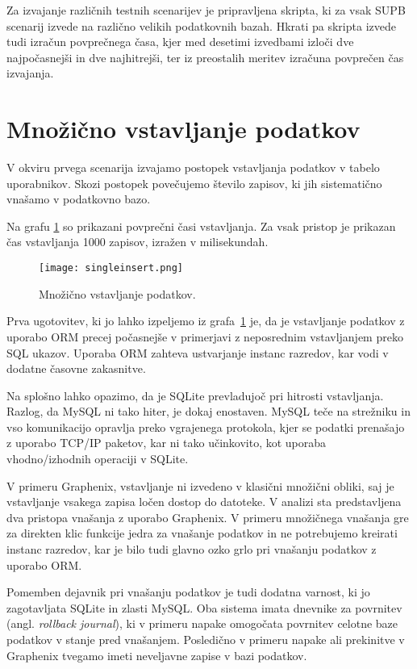 \documentclass[a4paper,12pt,openright]{book}
\begin{document}
    Za izvajanje različnih testnih scenarijev je pripravljena skripta, ki za vsak SUPB scenarij izvede na različno velikih podatkovnih bazah. Hkrati pa skripta izvede tudi izračun povprečnega časa, kjer med desetimi izvedbami izloči dve najpočasnejši in dve najhitrejši, ter iz preostalih meritev izračuna povprečen čas izvajanja.

    \newpage
   \section{Množično vstavljanje podatkov}

    V okviru prvega scenarija izvajamo postopek vstavljanja podatkov v tabelo uporabnikov. Skozi postopek povečujemo število zapisov, ki jih sistematično vnašamo v podatkovno bazo.

    Na grafu \ref{vnos} so prikazani povprečni časi vstavljanja. Za vsak pristop je prikazan čas vstavljanja 1000 zapisov, izražen v milisekundah.
   
   \begin{figure}[H]
        \centerline{\texttt{[image: singleinsert.png]}}
        \caption{Množično vstavljanje podatkov.}
        \label{vnos}
    \end{figure}

    \noindent
    Prva ugotovitev, ki jo lahko izpeljemo iz grafa~\ref{vnos} je, da je vstavljanje podatkov z uporabo ORM precej počasnejše v primerjavi z neposrednim vstavljanjem preko SQL ukazov. Uporaba ORM zahteva ustvarjanje instanc razredov, kar vodi v dodatne časovne zakasnitve.

    Na splošno lahko opazimo, da je SQLite prevladujoč pri hitrosti vstavljanja. Razlog, da MySQL ni tako hiter, je dokaj enostaven. MySQL teče na strežniku in vso komunikacijo opravlja preko vgrajenega protokola, kjer se podatki prenašajo z uporabo TCP/IP paketov, kar ni tako učinkovito, kot uporaba vhodno/izhodnih operaciji v SQLite.

    V primeru Graphenix, vstavljanje ni izvedeno v klasični množični obliki, saj je vstavljanje vsakega zapisa ločen dostop do datoteke. V analizi sta predstavljena dva pristopa vnašanja z uporabo Graphenix. V primeru množičnega vnašanja gre za direkten klic funkcije jedra za vnašanje podatkov in ne potrebujemo kreirati instanc razredov, kar je bilo tudi glavno ozko grlo pri vnašanju podatkov z uporabo ORM.

    Pomemben dejavnik pri vnašanju podatkov je tudi dodatna varnost, ki jo zagotavljata SQLite in zlasti MySQL. Oba sistema imata dnevnike za povrnitev (angl. \textit{rollback journal}), ki v primeru napake omogočata povrnitev celotne baze podatkov v stanje pred vnašanjem. Posledično v primeru napake ali prekinitve v Graphenix tvegamo imeti neveljavne zapise v bazi podatkov.
\end{document}
